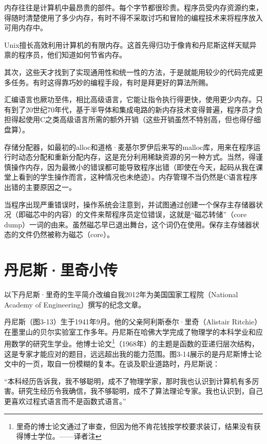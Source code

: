 \documentclass[a4paper,12pt,UTF8,twoside]{ctexbook}
\begin{document}
内存往往是计算机中最昂贵的部件。每个字节都很珍贵。程序员受内存资源约束，得随时清楚使用了多少内存，有时不得不采取讨巧和冒险的编程技术来将程序放入可用内存中。

Unix擅长高效利用计算机的有限内存。这首先得归功于像肯和丹尼斯这样天赋异禀的程序员，他们知道如何节省内存。

其次，这些天才找到了实现通用性和统一性的方法，于是就能用较少的代码完成更多任务。有时这得靠巧妙的编程手段，有时是拜更好的算法所赐。

汇编语言也厥功至伟，相比高级语言，它能让指令执行得更快，使用更少内存。只有到了20世纪70年代，基于半导体和集成电路的新内存技术变得普遍，程序员才负担得起使用C之类高级语言所需的额外开销（这些开销虽然不特别高，但也得仔细盘算）。

存储分配器，如最初的alloc和道格·麦基尔罗伊后来写的malloc库，用来在程序运行时动态分配和重新分配内存，这是充分利用稀缺资源的另一种方式。当然，得谨慎操作内存，因为最微小的错误都可能导致程序出错（即使在今天，起码从我在课堂上看到的学生操作而言，这种情况也未绝迹）。内存管理不当仍然是C语言程序出错的主要原因之一。

当程序出现严重错误时，操作系统会注意到，并试图通过创建一个保存主存储器状况（即磁芯中的内容）的文件来帮程序员定位错误，这就是“磁芯转储”（core dump）一词的由来。虽然磁芯早已退出舞台，这个词仍在使用。保存主存储器状态的文件仍然被称为磁芯（core）。

\section{丹尼斯·里奇小传}

以下丹尼斯·里奇的生平简介改编自我2012年为美国国家工程院（National Academy of Engineering）撰写的纪念文章。

丹尼斯（图3-13）生于1941年9月。他的父亲阿利斯泰尔·里奇（Alistair Ritchie）在墨里山的贝尔实验室工作多年。丹尼斯在哈佛大学完成了物理学的本科学业和应用数学的研究生学业。他博士论文\footnote{里奇的博士论文通过了审查，但因为他不肯花钱按学校要求装订，结果没有获得博士学位。——译者注}（1968年）的主题是函数的亚递归层次结构，这是专家才能应对的题目，远远超出我的能力范围。图3-14展示的是丹尼斯博士论文中的一页，取自一份模糊的复本。在谈及职业道路时，丹尼斯说：

“本科经历告诉我，我不够聪明，成不了物理学家，那时我也认识到计算机有多厉害。研究生经历令我确信，我不够聪明，成不了算法理论专家。我也认识到，自己更喜欢过程式语言而不是函数式语言。”
\end{document}
